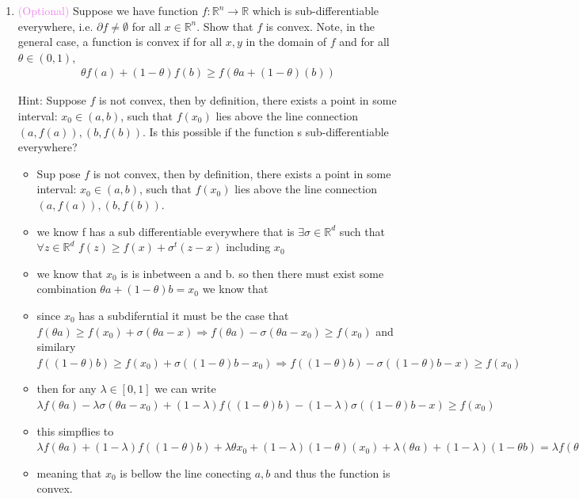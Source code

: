 \documentclass{article}
\theoremstyle{plain}
\theoremstyle{definition}
\begin{document}
\begin{enumerate}
\item \textcolor{violet}{(Optional)} Suppose we have function $f:\mathbb{R}^n\rightarrow\mathbb{R}$ which is sub-differentiable everywhere, i.e. $\partial f\neq \emptyset$ for all $x\in\mathbb{R}^n$. Show that $f$ is convex. Note, in the general case, a function is convex if for all $x,y$ in the domain of $f$ and for all $\theta \in (0,1)$,
\begin{align*}
    \theta f(a)+(1-\theta)f(b) \geq f(\theta a+(1-\theta)(b))
\end{align*}

Hint: Suppose $f$ is not convex, then by definition, there exists a point in some interval: $x_0\in (a,b)$, such that $f(x_0)$ lies above the line connection $(a,f(a)), (b,f(b))$. Is this possible if the function s sub-differentiable everywhere? 
\begin{itemize}
\color{blue}
    \item Sup pose $f$ is not convex, then by definition, there exists a point in some interval: $x_0\in (a,b)$, such that $f(x_0)$ lies above the line connection $(a,f(a)), (b,f(b))$.
    \item we know f has a sub differentiable everywhere that is $\exists \sigma\in \mathbb{R}^{d}$ such that $\forall z\in \mathbb{R}^{d}$ $f(z)\geq f(x)+\sigma^t(z-x)$ including $x_0$
    \item we know that $x_0$ is is inbetween a and b. so then there must exist some combination $\theta a+ (1-\theta)b=x_0$ we know that 
    \item since $x_0$ has a subdiferntial it must be the case that $f(\theta a)\geq f(x_0)+\sigma(\theta a- x)\Rightarrow f(\theta a)-\sigma(\theta a-x_0)\geq f(x_0)$ and similary $f((1-\theta) b)\geq f(x_0)+\sigma((1-\theta) b- x_0)\Rightarrow f((1-\theta) b)-\sigma((1-\theta) b-x)\geq f(x_0)$
    \item then for any $\lambda \in [0,1]$ we can write $\lambda f(\theta a)-\lambda\sigma(\theta a-x_0)+(1-\lambda )f((1-\theta) b)-(1-\lambda )\sigma((1-\theta) b-x)\geq f(x_0)$
    \item this simpflies to $\lambda f(\theta a)+(1-\lambda)f((1-\theta)b)+\lambda \theta x_0 + (1-\lambda)(1-\theta)(x_0)+\lambda(\theta a)+(1-\lambda)(1-\theta b)=\lambda f(\theta a)+(1-\lambda)f((1-\theta)b)+x_0-x_0=\lambda f(\theta a)+(1-\lambda)f((1-\theta)b)\geq f(x_0)=f(\lambda (\theta a) +(1-\lambda) ((1-\theta) b)$
    \item meaning that $x_0$ is bellow the line conecting $a,b$ and thus the function is convex.
    
\end{itemize}

\setcounter{saveenum}{\value{enumi}}
\end{enumerate}
\end{document}
